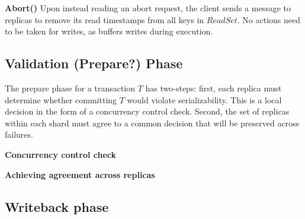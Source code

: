 \par \textbf{Abort()} Upon instead reading an abort request,
the client sends a message to replicas to remove its read timestamps from all keys in $ReadSet$. No actions need to be taken for writes, as \sys buffers writes during execution.

\subsection{Validation (Prepare?) Phase}
The prepare phase for a transaction $T$ has two-steps: first,
each replica must determine whether committing $T$ would violate serializability. This is a local decision in the form of a concurrency control check. Second, the set of replicas within
each shard must agree to a common decision that will be preserved across failures. 

\par \textbf{Concurrency control check}

\par \textbf{Achieving agreement across replicas}

\subsection{Writeback phase}
